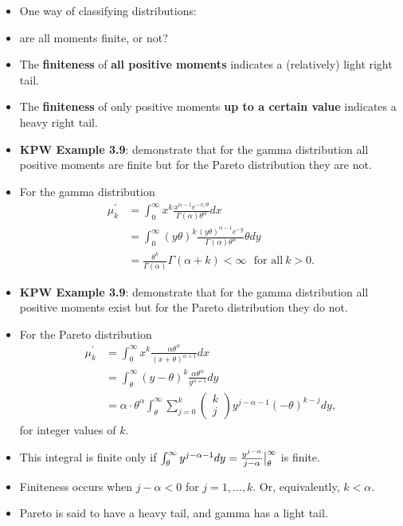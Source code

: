 \documentclass[]{book}
\begin{document}
\begin{itemize}
\item
  One way of classifying distributions:
\item
  are all moments finite, or not?
\item
  The \textbf{finiteness} of \textbf{all positive moments} indicates a
  (relatively) light right tail.
\item
  The \textbf{finiteness} of only positive moments \textbf{up to a
  certain value} indicates a heavy right tail.
\item
  \textbf{KPW Example 3.9}: demonstrate that for the gamma distribution
  all positive moments are finite but for the Pareto distribution they
  are not.
\item
  For the gamma distribution \[\begin{aligned}
  \mu_k^{'} &= \int_0^{\infty} x^k \frac{x^{\alpha-1} e^{-x/\theta}}{\Gamma(\alpha) \theta^{\alpha}} dx \\
  &= \int_0^{\infty} (y\theta)^k  \frac{(y\theta)^{\alpha-1} e^{-y}}{\Gamma(\alpha) \theta^{\alpha}} \theta dy \\
  &= \frac{\theta^k}{\Gamma(\alpha)} \Gamma(\alpha+k) < \infty \ \ \ \text{for\ all}\ k>0.\end{aligned}\]
\item
  \textbf{KPW Example 3.9}: demonstrate that for the gamma distribution
  all positive moments exist but for the Pareto distribution they do
  not.
\item
  For the Pareto distribution \[\begin{aligned}
  \mu_k^{'} &= \int_0^{\infty} x^k \frac{\alpha \theta^{\alpha}}{(x+\theta)^{\alpha+1}} dx \\
  &= \int_{\theta}^{\infty} (y-\theta)^k \frac{\alpha \theta^{\alpha}}{y^{\alpha+1}} dy \\
  &= \alpha \cdot \theta^{\alpha} \int_{\theta}^{\infty} \sum_{j=0}^k \left(\begin{array}{c}
   k \\
   j
   \end{array} \right) y^{j-\alpha-1} (-\theta)^{k-j} dy,\end{aligned}\]
  for integer values of \(k\).
\item
  This integral is finite only if
  \(\int_{\theta}^{\infty} y^{j-\alpha-1} dy = \frac{y^{j-\alpha}}{j-\alpha}\big{|}_{\theta}^{\infty}\)
  is finite.
\item
  Finiteness occurs when \(j-\alpha < 0\) for \(j=1, \ldots,k\). Or,
  equivalently, \(k< \alpha\).
\item
  Pareto is said to have a heavy tail, and gamma has a light tail.
\end{itemize}
\end{document}
